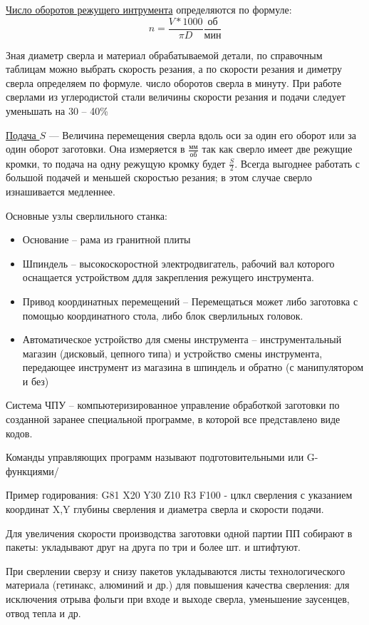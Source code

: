 \documentclass{article}
\begin{document}
\underline{Число оборотов режущего интрумента} определяются по формуле:
$$
n = \frac{V * 1000}{\pi D } \frac{об}{мин}
$$

Зная диаметр сверла и материал обрабатываемой детали, по справочным таблицам можно выбрать скорость резания, а по скорости резания и диметру сверла определяем по формуле. число оборотов сверла в минуту. При работе сверлами из углеродистой стали величины скорости резания и подачи следует уменьшать на 30 -- 40\%

\underline{Подача $S$} --- Величина перемещения сверла вдоль оси за один его оборот или за один оборот заготовки. Она измеряется в $ \frac{мм}{об}$ так как сверло имеет две режущие кромки, то подача на одну режущую кромку будет $ \frac{S}{2} $. Всегда выгоднее работать с большой подачей и меньшей скоростью резания; в этом случае сверло изнашивается медленнее. 

Основные узлы сверлильного станка:
\begin{itemize}
	\item Основание -- рама из гранитной плиты
	\item Шпиндель -- высокоскоростной электродвигатель, рабочий вал которого оснащается устройством ддля закрепления режущего инструмента.
	\item Привод координатных перемещений -- Перемещаться может либо заготовка с помощью координатного стола, либо блок сверлильных головок.
	\item Автоматическое устройство для смены инструмента -- инструментальный магазин (дисковый, цепного типа) и устройство смены инструмента, передающее инструмент из магазина в шпиндель и обратно (с манипулятором и без)
\end{itemize}

Система ЧПУ -- компьютеризированное управление обработкой заготовки по созданной заранее специальной программе, в которой все представлено виде кодов.

Команды управляющих программ называют подготовительными или G-функциями/

Пример годирования:
G81 X20 Y30 Z10 R3 F100 - цлкл сверления с указанием координат X,Y глубины сверления и диаметра сверла и скорости подачи.

Для увеличения скорости производства заготовки одной партии ПП собирают в пакеты: укладывают друг на друга по три и более шт. и штифтуют.

При сверлении сверзу и снизу пакетов укладываются листы технологического материала (гетинакс, алюминий и др.) для повышения качества сверления: для исключения отрыва фольги при входе и выходе сверла, уменьшение заусенцев, отвод тепла и др.
\end{document}
